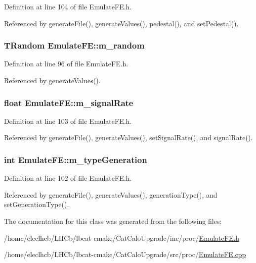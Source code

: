 Definition at line 104 of file EmulateFE.h.

Referenced by generateFile(), generateValues(), pedestal(), and setPedestal().\hypertarget{classEmulateFE_a7f883bc6fb5bde2c98e464ef74e5c643}{
\subsubsection[{m\_\-random}]{\setlength{\rightskip}{0pt plus 5cm}TRandom {\bf EmulateFE::m\_\-random}}}
\label{classEmulateFE_a7f883bc6fb5bde2c98e464ef74e5c643}


Definition at line 96 of file EmulateFE.h.

Referenced by generateValues().\hypertarget{classEmulateFE_a7aeff9e62f850ca6d7ee27dce02a060b}{
\subsubsection[{m\_\-signalRate}]{\setlength{\rightskip}{0pt plus 5cm}float {\bf EmulateFE::m\_\-signalRate}}}
\label{classEmulateFE_a7aeff9e62f850ca6d7ee27dce02a060b}


Definition at line 103 of file EmulateFE.h.

Referenced by generateFile(), generateValues(), setSignalRate(), and signalRate().\hypertarget{classEmulateFE_aa8bd0aa42cc5f3d52930408807b3067c}{
\subsubsection[{m\_\-typeGeneration}]{\setlength{\rightskip}{0pt plus 5cm}int {\bf EmulateFE::m\_\-typeGeneration}}}
\label{classEmulateFE_aa8bd0aa42cc5f3d52930408807b3067c}


Definition at line 102 of file EmulateFE.h.

Referenced by generateFile(), generateValues(), generationType(), and setGenerationType().

The documentation for this class was generated from the following files:\begin{DoxyCompactItemize}
\item 
/home/eleclhcb/LHCb/lbcat-\/cmake/CatCaloUpgrade/inc/proc/\hyperlink{EmulateFE_8h}{EmulateFE.h}\item 
/home/eleclhcb/LHCb/lbcat-\/cmake/CatCaloUpgrade/src/proc/\hyperlink{EmulateFE_8cpp}{EmulateFE.cpp}\end{DoxyCompactItemize}

